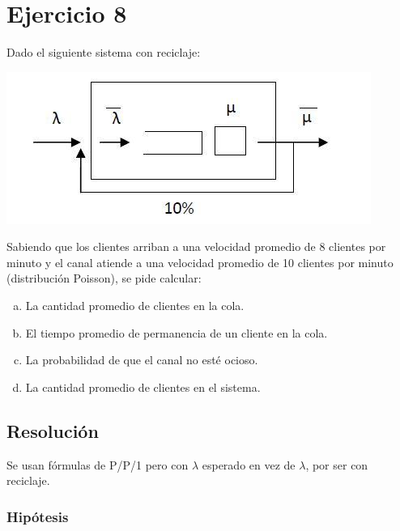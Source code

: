 \documentclass[a4paper,11pt]{article}
\begin{document}
\vspace{35pt}
\section{\textbf{Ejercicio 8}}

\vspace{13pt}
Dado el siguiente sistema con reciclaje:

\includegraphics[width=338pt, height=141pt, keepaspectratio=true]{TP1-Colas-fig007.png}

\vspace{27pt}
Sabiendo que los clientes arriban a una velocidad promedio de 8 clientes por
minuto y el canal atiende a una velocidad promedio de 10 clientes por minuto
(distribución Poisson), se pide calcular:
\begin{enumerate}[a)]
  \item La cantidad promedio de clientes en la cola.
  \item El tiempo promedio de permanencia de un cliente en la cola.
  \item La probabilidad de que el canal no esté ocioso.
  \item La cantidad promedio de clientes en el sistema.
\end{enumerate}

\vspace{13pt}
\leftskip=0pt
\parindent=0pt
\subsection{\textbf{Resolución}}

Se usan fórmulas de P/P/1 pero con $\lambda$ esperado 
en vez de $\lambda$, por ser con reciclaje.

\vspace{21pt}
\subsubsection*{Hipótesis}
\end{document}

